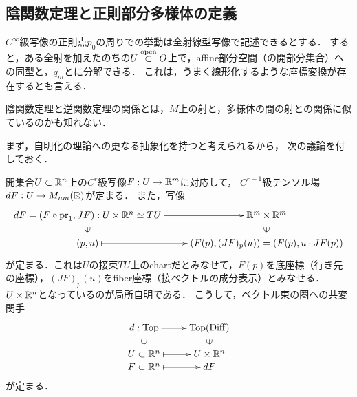 \documentclass[uplatex,dvipdfmx]{jsreport}
\begin{document}
\subsection{陰関数定理と正則部分多様体の定義}

\begin{tcolorbox}[colframe=ForestGreen, colback=ForestGreen!10!white,breakable,colbacktitle=ForestGreen!40!white,coltitle=black,fonttitle=\bfseries\sffamily,
title=$C^\infty$級ならば，多様体を線型化する座標変換を構成する算譜が存在する]
    $C^\infty$級写像の正則点$p_0$の周りでの挙動は全射線型写像で記述できるとする．
    すると，ある全射を加えたのちの$U\overset{\mathrm{open}}{\subset} O$上で，affine部分空間（の開部分集合）への同型と，$q_m$とに分解できる．
    これは，うまく線形化するような座標変換が存在するとも言える．

    陰関数定理と逆関数定理の関係とは，$M$上の射と，多様体の間の射との関係に似ているのかも知れない．
\end{tcolorbox}

まず，自明化の理論への更なる抽象化を持つと考えられるから，
次の議論を付しておく．

\begin{discussion}[$\R^n$上の微分]
    開集合$U\subset\mathbb{R}^n$上の$C^r$級写像$F:U\to\mathbb{R}^m$に対応して，
    $C^{r-1}$級テンソル場$dF:U\to M_{nm}(\mathbb{R})$が定まる．
    また，写像
    \[\xymatrix@R-2pc{
        dF=(F\circ\pr_1,JF):U\times\R^n\simeq TU\ar[r]&\R^m\times\R^m\\
        \rotatebox[origin=c]{90}{$\in$}&\rotatebox[origin=c]{90}{$\in$}\\
        (p,u)\ar@{|->}[r]&\paren{F(p),(JF)_p(u)}=\paren{F(p),u\cdot JF(p)}
    }\]
    が定まる．これは$U$の接束$TU$上のchartだとみなせて，$F(p)$を底座標（行き先の座標），$(JF)_p(u)$をfiber座標（接ベクトルの成分表示）とみなせる．
    $U\times\mathbb{R}^n$となっているのが局所自明である．
    こうして，ベクトル束の圏への共変関手
    \[\xymatrix@R-2pc{
        d:\Top\ar[r]&\Top(\Diff)\\
        \rotatebox[origin=c]{90}{$\in$}&\rotatebox[origin=c]{90}{$\in$}\\
        U\subset\R^n\ar@{|->}[r]&U\times\R^n\\
        F\subset\R^n\ar@{|->}[r]&dF
    }\]
    が定まる．
\end{discussion}
\end{document}
